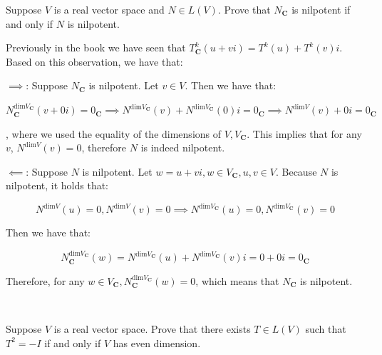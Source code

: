 \begin{exercise}{7}
    Suppose $V$ is a real vector space and $N \in L(V)$. Prove that $N_\mathbf{C}$ is nilpotent if and only if $N$ is nilpotent.
\end{exercise}

\begin{solution}

    Previously in the book we have seen that $T_\mathbf{C}^k(u+vi) = T^k(u) +T^k(v)i$. Based on this observation, we have that:

    $\implies$: Suppose $N_\mathbf{C}$ is nilpotent. Let $v \in V$. Then we have that:

    $$N_\mathbf{C}^{\text{dim} V_\mathbf{C}}(v+0i) = 0_\mathbf{C} \implies N^{\text{dim} V_\mathbf{C}}(v) + N^{\text{dim} V_\mathbf{C}}(0)i = 0_\mathbf{C} \implies N^{\text{dim} V}(v) +0i = 0_\mathbf{C}$$

    , where we used the equality of the dimensions of $V, V_\mathbf{C}.$ This implies that for any $v$, $N^{\text{dim} V}(v) = 0$, therefore $N$ is indeed nilpotent.

    $\impliedby$: Suppose $N$ is nilpotent. Let $w = u + vi, w \in V_\mathbf{C}, u, v \in V$. Because $N$ is nilpotent, it holds that:

    $$N^{\text{dim} V}(u) = 0, N^{\text{dim} V}(v) = 0 \implies N^{\text{dim} V_\mathbf{C}}(u) = 0, N^{\text{dim} V_\mathbf{C}}(v) = 0$$

    Then we have that:

    $$N_\mathbf{C}^{\text{dim} V_\mathbf{C}}(w) = N^{\text{dim} V_\mathbf{C}}(u) + N^{\text{dim} V_\mathbf{C}}(v)i = 0 + 0i = 0_\mathbf{C}$$

    Therefore, for any $w \in V_\mathbf{C}, N_\mathbf{C}^{\text{dim} V_\mathbf{C}}(w) = 0$, which means that $N_\mathbf{C}$ is nilpotent.
\end{solution}
\\
\begin{exercise}{16}
    Suppose $V$ is a real vector space. Prove that there exists $T \in L(V)$ such that $T^2 = -I$ if and only if $V$ has even dimension.
\end{exercise}


